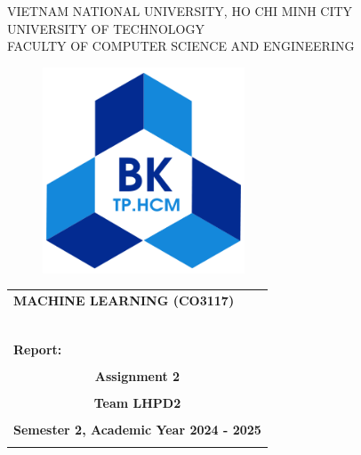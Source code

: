 \documentclass[openany]{mitthesis}
\theoremstyle{definition}
\begin{document}

\begin{titlepage}
\begin{center}
VIETNAM NATIONAL UNIVERSITY, HO CHI MINH CITY \\
UNIVERSITY OF TECHNOLOGY \\
FACULTY OF COMPUTER SCIENCE AND ENGINEERING
\end{center}

\begin{figure}[h!]
\begin{center}
\includegraphics[width=6cm]{hcmut.png}
\end{center}
\end{figure}

\begin{center}
\begin{tabular}{c}
\multicolumn{1}{l}{\textbf{{\Large MACHINE LEARNING (CO3117)}}}\\
~~\\
\hline
\\
\multicolumn{1}{l}{\textbf{{\Large Report:}}}\\
\\
\textbf{{\Huge Assignment 2}}\\
\\
\textbf{{Team LHPD2}}\\
\\
\textbf{Semester 2, Academic Year 2024 - 2025}\\
\\
\hline
\end{tabular}
\end{center}

\vspace{1cm}


\end{titlepage}
\end{document}
